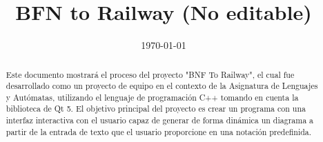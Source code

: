 \documentclass[conference]{IEEEtran}
\date{\specialdate\today}
\begin{document}
%
%
%

\newcommand{\breite}{0.9} %
\newcommand{\RelacionFiguradoscolumnas}{0.9}
\newcommand{\RelacionFiguradoscolumnasPuntoCinco}{0.45}




\title{BFN to Railway (No editable)}

\author{
}


\maketitle

\begin{abstract} 
Este documento mostrará el proceso del proyecto "BNF To Railway"\cite{railwayinfo}, el cual fue desarrollado como un proyecto de equipo en el contexto de la Asignatura de Lenguajes y Autómatas, utilizando el lenguaje de programación C++\cite{c++} tomando en cuenta la biblioteca de Qt 5.\cite{qt} El objetivo principal del proyecto es crear un programa con una interfaz interactiva con el usuario capaz de generar de forma dinámica un diagrama a partir de la entrada de texto que el usuario proporcione en una notación predefinida.
\end{abstract}


\end{document}
